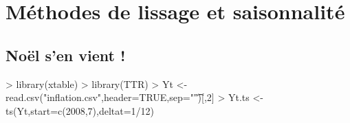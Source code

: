 \documentclass{article}
\begin{document}


\section{Méthodes de lissage et saisonnalité}
\label{sec:serie-dexercices-1}

\subsection{Noël s'en vient !}
\label{sec:exercice-1-1}

\begin{Schunk}
\begin{Sinput}
> library(xtable) 
> library(TTR)
> Yt <- read.csv("inflation.csv",header=TRUE,sep="\t")[,2] 
> Yt.ts <-ts(Yt,start=c(2008,7),deltat=1/12) 
\end{Sinput}
\end{Schunk}
\end{document}
